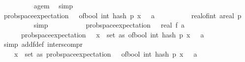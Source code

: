 \begin{isabellebody}
\ \ \ \ \ \ \ \ \isamarkupfalse%
\ a{\isacharunderscore}{\kern0pt}ge{\isacharunderscore}{\kern0pt}m{}\ \isamarkupfalse%
\ simp\isanewline
\ \ \ \ \ \ \isamarkupfalse%
\ \isamarkupfalse%
\ {\isachardoublequoteopen}prob{\isacharunderscore}{\kern0pt}space{\isachardot}{\kern0pt}expectation\ {\isasymOmega}\ {\isacharparenleft}{\kern0pt}{\isasymlambda}{\isasymomega}{\isachardot}{\kern0pt}\ of{\isacharunderscore}{\kern0pt}bool\ {\isacharparenleft}{\kern0pt}int\ {\isacharparenleft}{\kern0pt}hash\ p\ x\ {\isasymomega}{\isacharparenright}{\kern0pt}\ {\isasymle}\ a{\isacharparenright}{\kern0pt}{\isacharparenright}{\kern0pt}\ {\isacharequal}{\kern0pt}\ \isanewline
\ \ \ \ \ \ \ \ {\isacharparenleft}{\kern0pt}real{\isacharunderscore}{\kern0pt}of{\isacharunderscore}{\kern0pt}int\ a{\isacharplus}{\kern0pt}{}{\isacharparenright}{\kern0pt}{\isacharslash}{\kern0pt}real\ p{\isachardoublequoteclose}\isanewline
\ \ \ \ \ \ \ \ \isamarkupfalse%
\ simp\isanewline
\ \ \ \ \isamarkupfalse%
\isanewline
\ \ \ \ \isamarkupfalse%
\ {\isachardoublequoteopen}prob{\isacharunderscore}{\kern0pt}space{\isachardot}{\kern0pt}expectation\ {\isasymOmega}\ {\isacharparenleft}{\kern0pt}{\isasymlambda}{\isasymomega}{\isachardot}{\kern0pt}\ real\ {\isacharparenleft}{\kern0pt}f\ a\ {\isasymomega}{\isacharparenright}{\kern0pt}{\isacharparenright}{\kern0pt}\ {\isacharequal}{\kern0pt}\ \isanewline
\ \ \ \ \ \ prob{\isacharunderscore}{\kern0pt}space{\isachardot}{\kern0pt}expectation\ {\isasymOmega}\ {\isacharparenleft}{\kern0pt}{\isasymlambda}{\isasymomega}{\isachardot}{\kern0pt}\ {\isacharparenleft}{\kern0pt}{\isasymSum}x\ {\isasymin}\ set\ as{\isachardot}{\kern0pt}\ of{\isacharunderscore}{\kern0pt}bool\ {\isacharparenleft}{\kern0pt}int\ {\isacharparenleft}{\kern0pt}hash\ p\ x\ {\isasymomega}{\isacharparenright}{\kern0pt}\ {\isasymle}\ a{\isacharparenright}{\kern0pt}{\isacharparenright}{\kern0pt}{\isacharparenright}{\kern0pt}{\isachardoublequoteclose}\isanewline
\ \ \ \ \ \ \isamarkupfalse%
\ {\isacharparenleft}{\kern0pt}simp\ add{\isacharcolon}{\kern0pt}f{\isacharunderscore}{\kern0pt}def\ inters{\isacharunderscore}{\kern0pt}compr{\isacharparenright}{\kern0pt}\isanewline
\ \ \ \ \isamarkupfalse%
\ \isamarkupfalse%
\ {\isachardoublequoteopen}{\isachardot}{\kern0pt}{\isachardot}{\kern0pt}{\isachardot}{\kern0pt}\ {\isacharequal}{\kern0pt}\ \ {\isacharparenleft}{\kern0pt}{\isasymSum}x\ {\isasymin}\ set\ as{\isachardot}{\kern0pt}\ prob{\isacharunderscore}{\kern0pt}space{\isachardot}{\kern0pt}expectation\ {\isasymOmega}\ {\isacharparenleft}{\kern0pt}{\isasymlambda}{\isasymomega}{\isachardot}{\kern0pt}\ of{\isacharunderscore}{\kern0pt}bool\ {\isacharparenleft}{\kern0pt}int\ {\isacharparenleft}{\kern0pt}hash\ p\ x\ {\isasymomega}{\isacharparenright}{\kern0pt}\ {\isasymle}\ a{\isacharparenright}{\kern0pt}{\isacharparenright}{\kern0pt}{\isacharparenright}{\kern0pt}{\isachardoublequoteclose}\isanewline

\end{isabellebody}
